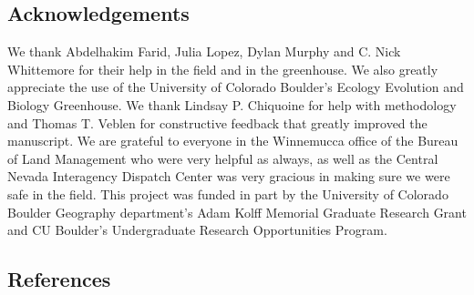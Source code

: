 \documentclass[
  12pt,
]{article}
\begin{document}
\hypertarget{acknowledgements}{%
\subsection{Acknowledgements}\label{acknowledgements}}

We thank Abdelhakim Farid, Julia Lopez, Dylan Murphy and C. Nick
Whittemore for their help in the field and in the greenhouse. We also
greatly appreciate the use of the University of Colorado Boulder's
Ecology Evolution and Biology Greenhouse. We thank Lindsay P. Chiquoine
for help with methodology and Thomas T. Veblen for constructive feedback
that greatly improved the manuscript. We are grateful to everyone in the
Winnemucca office of the Bureau of Land Management who were very helpful
as always, as well as the Central Nevada Interagency Dispatch Center was
very gracious in making sure we were safe in the field. This project was
funded in part by the University of Colorado Boulder Geography
department's Adam Kolff Memorial Graduate Research Grant and CU
Boulder's Undergraduate Research Opportunities Program.

\hypertarget{references}{%
\subsection{References}\label{references}}

\singlespacing
\end{document}
